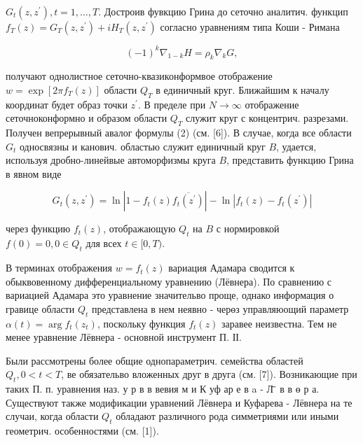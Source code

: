 \documentclass[10pt]{article}
\begin{document}
$G_{t}\left(z, z^{\prime}\right), t=1, \ldots, T$. Достроив фувкцию Грина до сеточно аналитич. функцип $f_{T}(z)=G_{T}\left(z, z^{\prime}\right)+i H_{T}\left(z, z^{\prime}\right)$ согласно уравнениям типа Коши - Римана



\[

(-1)^{k} \nabla_{1-k} H=\rho_{k} \nabla_{k} G,

\]



получают однолистное сеточно-квазиконформвое отображение $w=\exp \left[2 \pi f_{T}(z)\right]$ области $Q_{T}$ в единичный круг. Ближайшим к началу координат будет образ точки $z^{\prime}$. В пределе при $N \rightarrow \infty$ отображение сеточноконформно и образом области $Q_{T}$ служит круг с концентрич. разрезами. Получен вепрерывный авалог формулы (2) (см. [6]). В случае, когда все области $G_{t}$ односвязны и канович. областью служит единичный круг $B$, удается, используя дробно-линейвые автоморфизмы круга $B$, представить функцию Грина в явном виде



\[

G_{t}\left(z, z^{\prime}\right)=\ln \left|1-f_{t}(z) \overline{f_{t}\left(z^{\prime}\right)}\right|-\ln \left|f_{t}(z)-f_{t}\left(z^{\prime}\right)\right|

\]



через функцию $f_{t}(z)$, отображающую $Q_{t}$ на $B$ с нормировкой $f(0)=0,0 \in Q_{t}$ для всех $t \in[0, T)$.



В терминах отображения $w=f_{t}(z)$ вариация Адамара сводится к обыквовенному дифференциальному уравнению (Лёвнера). По сравнению с вариацией Адамара это уравнение значительво проще, однако информация о гравице области $Q_{t}$ представлена в нем неявно - черөз управляюощий параметр $\alpha(t)=\arg f_{t}\left(z_{t}\right)$, поскольку функция $f_{t}(z)$ заравее неизвестна. Тем не менее уравнение Лёвнера - основной инструмент П. ІІ.



Были рассмотрены более общие однопараметрич. семейства областей $Q_{t}, 0<t<T$, ве обязательво вложенных друг в друга (см. [7]). Возникающие при таких П. п. уравнения наз. у р в в вевия м и К уф ар е в a - Л ̈̈ в в ө р а. Существуют также модификации уравнений Лёвнера и Куфарева - Лёвнера на те случаи, когда области $Q_{t}$ обладают различного рода симметриями или иными геометрич. особенностями (см. [1]).
\end{document}
